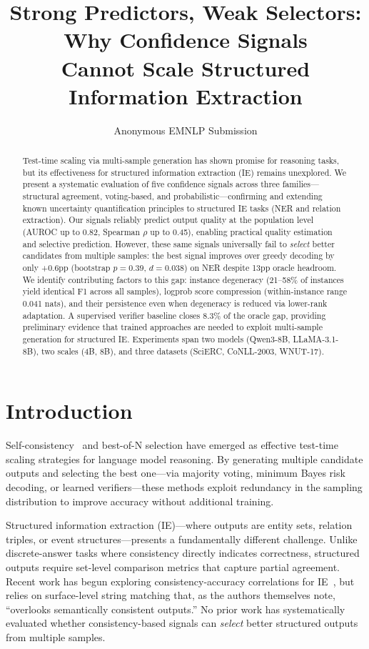 \documentclass[11pt,a4paper]{article}
\title{Strong Predictors, Weak Selectors: Why Confidence Signals\\ Cannot Scale Structured Information Extraction}
\author{Anonymous EMNLP Submission}
\date{}
\begin{document}
\maketitle

\begin{abstract}
Test-time scaling via multi-sample generation has shown promise for reasoning tasks, but its effectiveness for structured information extraction (IE) remains unexplored.
We present a systematic evaluation of five confidence signals across three families---structural agreement, voting-based, and probabilistic---confirming and extending known uncertainty quantification principles to structured IE tasks (NER and relation extraction).
Our signals reliably predict output quality at the population level (AUROC up to 0.82, Spearman $\rho$ up to 0.45), enabling practical quality estimation and selective prediction.
However, these same signals universally fail to \emph{select} better candidates from multiple samples: the best signal improves over greedy decoding by only +0.6pp (bootstrap $p=0.39$, $d=0.038$) on NER despite 13pp oracle headroom.
We identify contributing factors to this gap: instance degeneracy (21--58\% of instances yield identical F1 across all samples), logprob score compression (within-instance range 0.041 nats), and their persistence even when degeneracy is reduced via lower-rank adaptation.
A supervised verifier baseline closes 8.3\% of the oracle gap, providing preliminary evidence that trained approaches are needed to exploit multi-sample generation for structured IE.
Experiments span two models (Qwen3-8B, LLaMA-3.1-8B), two scales (4B, 8B), and three datasets (SciERC, CoNLL-2003, WNUT-17).
\end{abstract}

\section{Introduction}

Self-consistency~\citep{wang2023selfconsistency} and best-of-N selection have emerged as effective test-time scaling strategies for language model reasoning.
By generating multiple candidate outputs and selecting the best one---via majority voting, minimum Bayes risk decoding, or learned verifiers---these methods exploit redundancy in the sampling distribution to improve accuracy without additional training.

Structured information extraction (IE)---where outputs are entity sets, relation triples, or event structures---presents a fundamentally different challenge.
Unlike discrete-answer tasks where consistency directly indicates correctness, structured outputs require set-level comparison metrics that capture partial agreement.
Recent work has begun exploring consistency-accuracy correlations for IE~\citep{nédellec2026consistency}, but relies on surface-level string matching that, as the authors themselves note, ``overlooks semantically consistent outputs.''
No prior work has systematically evaluated whether consistency-based signals can \emph{select} better structured outputs from multiple samples.
\end{document}
